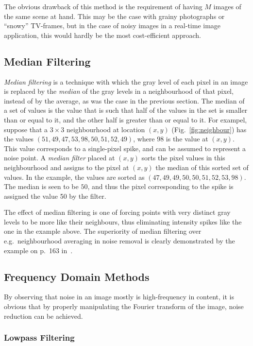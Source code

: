 The obvious drawback of this method is the requirement of having $M$
images of the same scene at hand.  This may be the case with grainy
photographs or ``snowy'' TV-frames, but in the case of noisy images in
a real-time image application, this would hardly be the most
cost-efficient approach.

\subsection{Median Filtering}
\label{image:noise:median}

{\em Median filtering\/} is a technique with which the gray level of
each pixel in an image is replaced by the {\em median\/} of the gray
levels in a neighbourhood of that pixel, instead of by the average, as
was the case in the previous section.  The median of a set of values
is the value that is such that half of the values in the set is
smaller than or equal to it, and the other half is greater than or
equal to it.  For exampel, suppose that a $3\times 3$ neighbourhood at
location $(x,y)$ (Fig.~\ref{fig:neighbour}) has the values
$(51,49,47,53,98,50,51,52,49)$, where $98$ is the value at $(x,y)$.
This value corresponds to a single-pixel spike, and can be assumed to
represent a noise point.  A {\em median filter\/} placed at $(x,y)$
sorts the pixel values in this neighbourhood and assigns to the pixel
at $(x,y)$ the median of this sorted set of values.  In the example,
the values are sorted as $(47,49,49,50,50,51,52,53,98)$.  The median
is seen to be $50$, and thus the pixel corresponding to the spike is
assigned the value 50 by the filter.

The effect of median filtering is one of forcing points with very
distinct gray levels to be more like their neighbours, thus
eliminating intensity spikes like the one in the example above.  The
superiority of median filtering over e.g.\ neighbourhood averaging in
noise removal is clearly demonstrated by the example on p.\ 163
in~\cite{digim}.

\subsection{Frequency Domain Methods}
\label{image:noise:frequency}

By observing that noise in an image mostly is high-frequency in
content, it is obvious that by properly manipulating the Fourier
transform of the image, noise reduction can be achieved.

\subsubsection{Lowpass Filtering}

